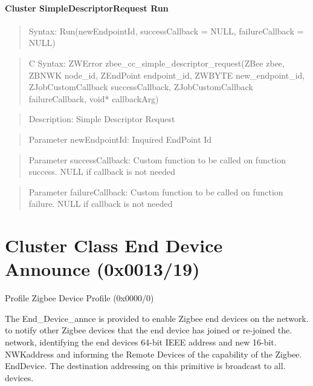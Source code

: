 \paragraph{Cluster SimpleDescriptorRequest Run}
\begin{quote}Syntax: Run(newEndpointId, successCallback = NULL, failureCallback = NULL)\end{quote}
\begin{quote}C Syntax: ZWError zbee\_cc\_simple\_descriptor\_request(ZBee zbee, ZBNWK node\_id, ZEndPoint endpoint\_id, ZWBYTE new\_endpoint\_id, ZJobCustomCallback successCallback, ZJobCustomCallback failureCallback, void* callbackArg)\end{quote}
\begin{quote}Description: Simple Descriptor Request\end{quote}
\begin{quote}Parameter newEndpointId: Inquired EndPoint Id\end{quote}
\begin{quote}Parameter successCallback: Custom function to be called on function success. NULL if callback is not needed\end{quote}
\begin{quote}Parameter failureCallback: Custom function to be called on function failure. NULL if callback is not needed\end{quote}



\section{Cluster Class End Device Announce (0x0013/19)}

Profile Zigbee Device Profile (0x0000/0)

The End\_Device\_annce is provided to enable Zigbee end devices on the network. to notify other Zigbee devices that the end device has joined or re-joined the. network, identifying the end devices 64-bit IEEE address and new 16-bit. NWKaddress and informing the Remote Devices of the capability of the Zigbee. EndDevice. The destination addressing on this primitive is broadcast to all. devices.
